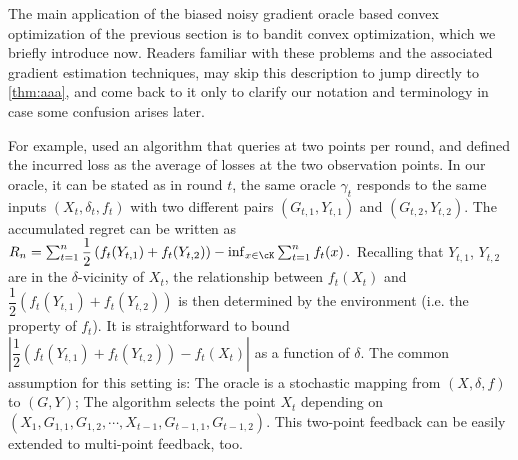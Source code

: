 The main application of the biased noisy gradient oracle based convex optimization of the previous section 
is to bandit convex optimization, which we briefly introduce now. Readers familiar with these problems and the associated
gradient estimation techniques, may skip this description to jump directly to \cref{thm:aaa},
and come back to it only to clarify our notation and terminology in case some confusion arises later.

For example, \cite{AgDeXi10} used an algorithm that queries at two points per round, and defined the incurred loss as the average of losses at the two observation points. In our oracle, it can be stated as in round $t$, the same oracle $\gamma_t$ responds to the same inputs $(X_t, \delta_t, f_t)$ with two different pairs $(G_{t,1}, Y_{t,1})$ and $(G_{t,2}, Y_{t,2})$. The accumulated regret can be written as 
$%
R_n = \sum_{t=1}^n \dfrac{1}{2}\left( f_t(Y_{t,1})+f_t(Y_{t,2}) \right) -\inf_{x \in \cK}\sum_{t=1}^n f_t(x) \,.
$ %
Recalling that $Y_{t,1}$, $Y_{t,2}$ are in the $\delta$-vicinity of $X_t$, the relationship between $f_t(X_t)$ and $\dfrac{1}{2}\left( f_t(Y_{t,1})+f_t(Y_{t,2})\right)$ is then determined by the environment (i.e. the property of $f_t$). It is straightforward to bound $| \dfrac{1}{2}\left( f_t(Y_{t,1})+f_t(Y_{t,2})\right)- f_t(X_t)|$ as a function of $\delta$. 
The common assumption for this setting is: The oracle is a stochastic mapping from $(X, \delta, f)$ to $(G, Y)$; The algorithm selects the point $X_t$ depending on $\left( X_1, G_{1,1}, G_{1,2}, \cdots, X_{t-1},G_{t-1,1}, G_{t-1,2}  \right)$. This two-point feedback can be easily extended to multi-point feedback, too.
\fi


